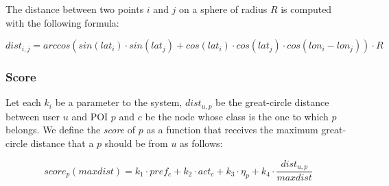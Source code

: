 The distance between two points $i$ and $j$ on a sphere of radius $R$ is computed with the following formula:

\begin{equation} \label{eq:gc-dist}
    dist_{i,j} = arccos( sin(lat_i) \cdot sin(lat_j) + cos(lat_i) \cdot cos(lat_j) \cdot cos(lon_i - lon_j) ) \cdot R
\end{equation}

\subsubsection{Score}
Let each $k_i$ be a parameter to the system, $dist_{u,p}$ be the great-circle distance between user $u$ and POI $p$ and $c$ be the node whose class is the one to which $p$ belongs. We define the \textit{score} of $p$ as a function that receives the maximum great-circle distance that a $p$ should be from $u$ as follows:

\begin{equation} \label{eq:score}
    score_p(maxdist) = k_1 \cdot pref_c + k_2 \cdot act_c + k_3 \cdot \eta_p + k_4 \cdot \frac{dist_{u,p}}{maxdist}
\end{equation}